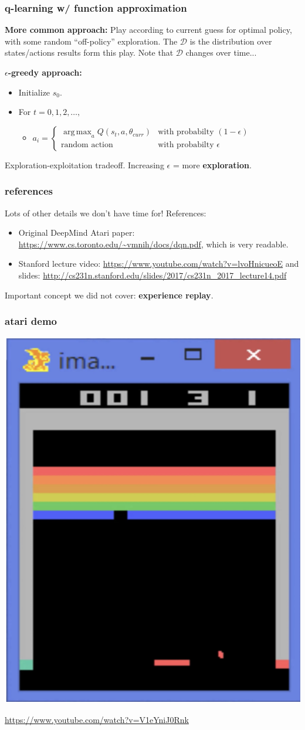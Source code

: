 \documentclass[handout,compress]{beamer}
\DeclareMathOperator*{\argmax}{arg\,max}
\begin{document}
\begin{frame}
	\frametitle{q-learning w/ function approximation}
	\textbf{More common approach:}
	Play according to current guess for optimal policy, with some random ``off-policy'' exploration. The $\mathcal{D}$ is the distribution over states/actions results form this play. Note that  $\mathcal{D}$ changes over time... 
	
	\textbf{$\epsilon$-greedy approach:}
	\begin{itemize}
		\item Initialize $s_0$.
		\item For $t=0, 1,2, \ldots, $
		\begin{itemize}
			\item $a_i = \begin{cases}\argmax_a Q(s_t,a, \theta_{curr}) & \text{with probabilty $(1-\epsilon)$}\\ \text{random action} & \text{with probabilty $\epsilon$} \end{cases}$ 
		\end{itemize}
	\end{itemize}
Exploration-exploitation tradeoff. Increasing $\epsilon$ = more \textbf{exploration}. 
\end{frame}

\begin{frame}
	\frametitle{references}
	\small
	Lots of other details we don't have time for! References:
	\begin{itemize}
		\item Original DeepMind Atari paper: \url{https://www.cs.toronto.edu/~vmnih/docs/dqn.pdf}, which is very readable.
		\item Stanford lecture video: \url{https://www.youtube.com/watch?v=lvoHnicueoE} and slides: \url{http://cs231n.stanford.edu/slides/2017/cs231n_2017_lecture14.pdf}
	\end{itemize}
	Important concept we did not cover: \textbf{experience replay}.
\end{frame}


\begin{frame}
	\frametitle{atari demo}
	\begin{center}
		\includegraphics[width=.4\textwidth]{atari_game.png}
	\end{center}
	\url{https://www.youtube.com/watch?v=V1eYniJ0Rnk}
\end{frame}
\end{document}
